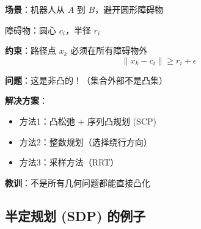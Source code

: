 \documentclass[12pt, a4paper]{ctexart}
\begin{document}
\begin{blackboard}

\textbf{场景}：机器人从 $A$ 到 $B$，避开圆形障碍物

障碍物：圆心 $c_i$，半径 $r_i$

\textbf{约束}：路径点 $x_k$ 必须在所有障碍物外
\[
\|x_k - c_i\| \geq r_i + \epsilon
\]

\textbf{问题}：这是非凸的！（集合外部不是凸集）

\textbf{解决方案}：
\begin{itemize}
    \item 方法1：凸松弛 + 序列凸规划 (SCP)
    \item 方法2：整数规划（选择绕行方向）
    \item 方法3：采样方法（RRT）
\end{itemize}

\textbf{教训}：不是所有几何问题都能直接凸化

\end{blackboard}

\subsection{半定规划 (SDP) 的例子}
\end{document}
